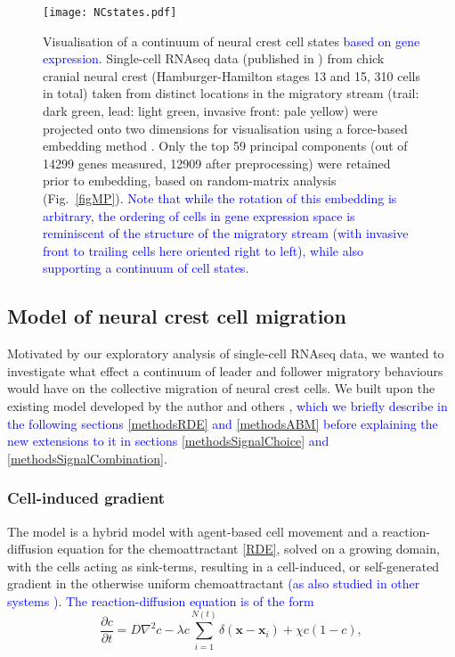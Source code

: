 \documentclass[review]{elsarticle}
\newcommand\hl[1]{{\textcolor{blue}{#1}}}
\newcommand{\partialdbyd}[2]{\ensuremath{\frac{\partial #1}{\partial #2}}}
\begin{document}
\begin{figure}
    \centering
    {\texttt{[image: NCstates.pdf]}}
    \caption{Visualisation of a continuum of neural crest cell states \hl{based on gene expression}. Single-cell RNAseq data (published in \cite{Morrison2017}) from chick cranial neural crest (Hamburger-Hamilton stages 13 and 15, 310 cells in total) taken from distinct locations in the migratory stream (trail: dark green, lead: light green, invasive front: pale yellow) were projected onto two dimensions for visualisation using a force-based embedding method \cite{Weinreb2018}. Only the top 59 principal components (out of 14299 genes measured, 12909 after preprocessing) were retained prior to embedding, based on random-matrix analysis \cite{Aparicio2018} (Fig.~\ref{figMP}). \hl{Note that while the rotation of this embedding is arbitrary, the ordering of cells in gene expression space is reminiscent of the structure of the migratory stream (with invasive front to trailing cells here oriented right to left), while also supporting a continuum of cell states.}\label{figscRNAseq}}
\end{figure}

\subsection{Model of neural crest cell migration}
Motivated by our exploratory analysis of single-cell RNAseq data, we wanted to investigate what effect a continuum of leader and follower migratory behaviours would have on the collective migration of neural crest cells. We built upon the existing model developed by the author and others \cite{McLennan2012,McLennan2015,McLennan2015b}, \hl{which we briefly describe in the following sections \ref{methodsRDE} and \ref{methodsABM} before explaining the new extensions to it in sections \ref{methodsSignalChoice} and \ref{methodsSignalCombination}}.

\subsubsection{Cell-induced gradient\label{methodsRDE}}
The model is a hybrid model with agent-based cell movement and a reaction-diffusion equation for the chemoattractant \eqref{RDE}, solved on a growing domain, with the cells acting as sink-terms, resulting in a cell-induced\cite{Kulesa2010a}, or self-generated gradient in the otherwise uniform chemoattractant \hl{(as also studied in other systems \cite{Streichan2011,Muinonen-Martin2014,Tweedy2016})}. \hl{The reaction-diffusion equation is of the form}
      \begin{equation}
       \partialdbyd{c}{t} = D\nabla^2{c} - \lambda c\sum_{i=1}^{N(t)} \delta(\mathbf{x} - \mathbf{x}_i)+ \chi c(1 - c),
      \end{equation}
\end{document}
